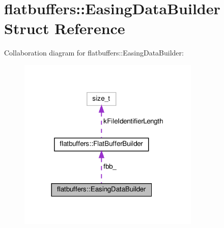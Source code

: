 \hypertarget{structflatbuffers_1_1EasingDataBuilder}{}\section{flatbuffers\+:\+:Easing\+Data\+Builder Struct Reference}
\label{structflatbuffers_1_1EasingDataBuilder}


Collaboration diagram for flatbuffers\+:\+:Easing\+Data\+Builder\+:
\nopagebreak
\begin{figure}[H]
\begin{center}
\leavevmode
\includegraphics[width=245pt]{structflatbuffers_1_1EasingDataBuilder__coll__graph}
\end{center}
\end{figure}
